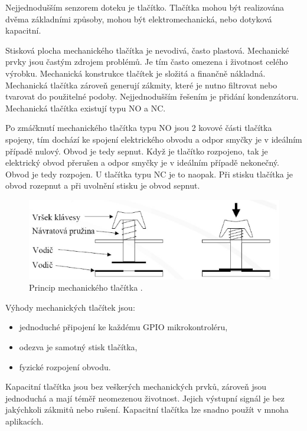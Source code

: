 Nejjednodušším senzorem doteku je tlačítko. 
Tlačítka mohou být realizována dvěma základními způsoby, mohou být elektromechanická, nebo dotyková kapacitní. 

Stisková plocha mechanického tlačítka je nevodivá, často plastová. Mechanické prvky jsou častým zdrojem problémů. Je tím často omezena i 
životnost celého výrobku. Mechanická konstrukce tlačítek je složitá a finančně nákladná. Mechanická tlačítka zároveň generují zákmity, které 
je nutno filtrovat nebo tvarovat do použitelné podoby. Nejjednodušším řešením je přidání kondenzátoru. Mechanická tlačítka existují typu NO 
a NC. 

Po zmáčknutí mechanického tlačítka typu NO jsou 2 kovové části tlačítka spojeny, tím dochází ke spojení elektrického obvodu 
a odpor smyčky je v ideálním případě nulový. Obvod je tedy sepnut. Když je tlačítko rozpojeno, tak je 
elektrický obvod přerušen a odpor smyčky je v ideálním případě nekonečný. Obvod je tedy rozpojen. U tlačítka typu NC je to naopak. Při stisku 
tlačítka je obvod rozepnut a při uvolnění stisku je obvod sepnut. 

\begin{figure}[!h]
  \begin{center}
    \includegraphics[scale=0.6]{obrazky/tlacitka_princip.png}
  \end{center}
  \caption[Princip mechanického tlačítka]{Princip mechanického tlačítka \cite{Mech_tl_princip}.}
\end{figure}

Výhody mechanických tlačítek jsou:
\begin{itemize}
  \item jednoduché připojení ke každému GPIO mikrokontroléru,
  \item odezva je samotný stisk tlačítka,
  \item fyzické rozpojení obvodu.
\end{itemize}

Kapacitní tlačítka jsou bez veškerých mechanických prvků, zároveň jsou jednoduchá a mají téměř neomezenou 
životnost. Jejich výstupní signál je bez jakýchkoli zákmitů nebo rušení. Kapacitní tlačítka lze snadno použít v mnoha aplikacích. 

